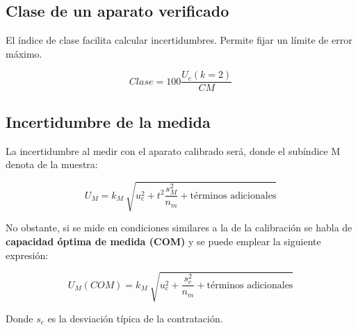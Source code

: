 \subsection{Clase de un aparato verificado}
El índice de clase facilita calcular incertidumbres. Permite fijar un límite de error máximo.

\[Clase=100 \frac{U_c (k=2)}{CM}\]

\subsection{Incertidumbre de la medida}
La incertidumbre al medir con el aparato calibrado será, donde el subíndice M denota de la muestra:

\[U_M=k_M \ \sqrt{u_c^2+t^2\frac{s_M^2}{n_m}+ \text{términos adicionales}}\]

No obstante, si se mide en condiciones similares a la de la calibración se habla de \textbf{capacidad óptima de medida (COM)} y se puede emplear la siguiente expresión:

\[U_M(COM)=k_M \ \sqrt{u_c^2+\frac{s_c^2}{n_m}+ \text{términos adicionales}}\]

Donde $s_c$ es la desviación típica de la contratación.



